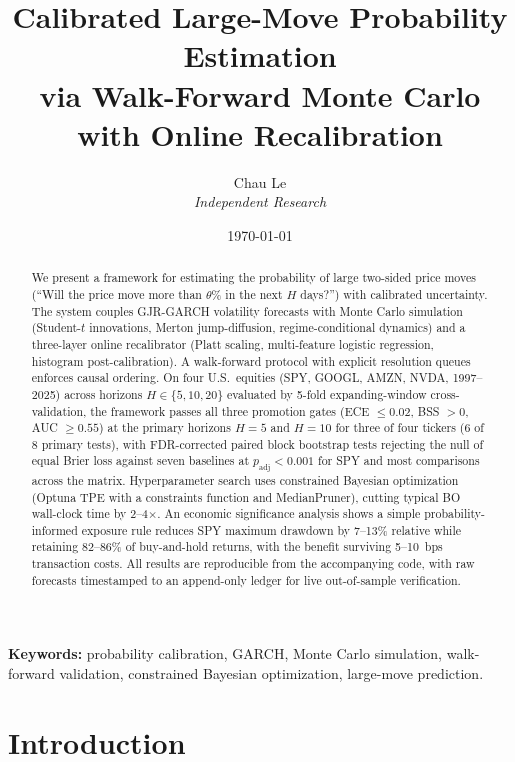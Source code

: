 \documentclass[11pt,a4paper]{article}
\title{Calibrated Large-Move Probability Estimation\\via Walk-Forward Monte Carlo with Online Recalibration}
\author{
  Chau Le \\
  \textit{Independent Research}
}
\date{\today}
\begin{document}
\maketitle

\begin{abstract}
We present a framework for estimating the probability of large two-sided price moves (``Will the price move more than $\theta$\% in the next $H$ days?'') with calibrated uncertainty. The system couples GJR-GARCH volatility forecasts with Monte Carlo simulation (Student-$t$ innovations, Merton jump-diffusion, regime-conditional dynamics) and a three-layer online recalibrator (Platt scaling, multi-feature logistic regression, histogram post-calibration). A walk-forward protocol with explicit resolution queues enforces causal ordering. On four U.S.\ equities (SPY, GOOGL, AMZN, NVDA, 1997--2025) across horizons $H \in \{5, 10, 20\}$ evaluated by 5-fold expanding-window cross-validation, the framework passes all three promotion gates (ECE $\leq 0.02$, BSS $> 0$, AUC $\geq 0.55$) at the primary horizons $H\!=\!5$ and $H\!=\!10$ for three of four tickers (6 of 8 primary tests), with FDR-corrected paired block bootstrap tests rejecting the null of equal Brier loss against seven baselines at $p_{\text{adj}} < 0.001$ for SPY and most comparisons across the matrix. Hyperparameter search uses constrained Bayesian optimization (Optuna TPE with a constraints function and MedianPruner), cutting typical BO wall-clock time by 2--4$\times$. An economic significance analysis shows a simple probability-informed exposure rule reduces SPY maximum drawdown by 7--13\% relative while retaining 82--86\% of buy-and-hold returns, with the benefit surviving 5--10~bps transaction costs. All results are reproducible from the accompanying code, with raw forecasts timestamped to an append-only ledger for live out-of-sample verification.
\end{abstract}

\noindent\textbf{Keywords:} probability calibration, GARCH, Monte Carlo simulation, walk-forward validation, constrained Bayesian optimization, large-move prediction.

\section{Introduction}
\label{sec:intro}
\end{document}
